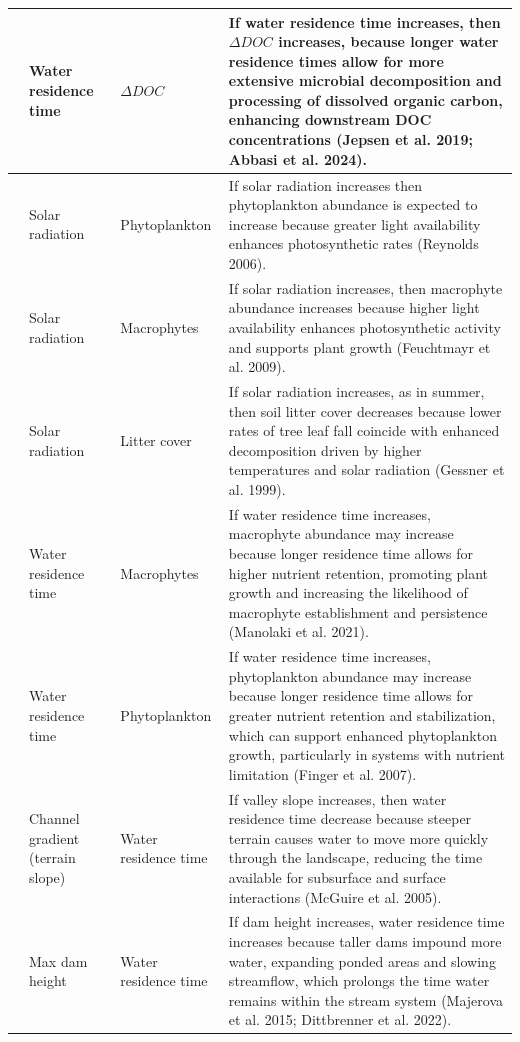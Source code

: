 \documentclass[11pt,a4paper]{article}
\begin{document}
\begin{longtable}{|>{\centering\arraybackslash}p{}|>{\raggedright\arraybackslash}p{}|>{\raggedright\arraybackslash}p{}|>{\raggedright\arraybackslash}p{}|}
5 & Water residence time & \(\Delta DOC\) & If water residence time increases, then \(\Delta DOC\) increases, because longer water residence times allow for more extensive microbial decomposition and processing of dissolved organic carbon, enhancing downstream DOC concentrations (Jepsen et al. 2019; Abbasi et al. 2024). \\ \hline
6 & Solar radiation & Phytoplankton & If solar radiation increases then phytoplankton abundance is expected to increase because greater light availability enhances photosynthetic rates (Reynolds 2006). \\ \hline
7 & Solar radiation & Macrophytes & If solar radiation increases, then macrophyte abundance increases because higher light availability enhances photosynthetic activity and supports plant growth (Feuchtmayr et al. 2009). \\ \hline
8 & Solar radiation & Litter cover & If solar radiation increases, as in summer, then soil litter cover decreases because lower rates of tree leaf fall coincide with enhanced decomposition driven by higher temperatures and solar radiation (Gessner et al. 1999). \\ \hline
9 & Water residence time & Macrophytes & If water residence time increases, macrophyte abundance may increase because longer residence time allows for higher nutrient retention, promoting plant growth and increasing the likelihood of macrophyte establishment and persistence (Manolaki et al. 2021). \\ \hline
10 & Water residence time & Phytoplankton & If water residence time increases, phytoplankton abundance may increase because longer residence time allows for greater nutrient retention and stabilization, which can support enhanced phytoplankton growth, particularly in systems with nutrient limitation (Finger et al. 2007). \\ \hline
11 & Channel gradient (terrain slope) & Water residence time & If valley slope increases, then water residence time decrease because steeper terrain causes water to move more quickly through the landscape, reducing the time available for subsurface and surface interactions (McGuire et al. 2005). \\ \hline
12 & Max dam height & Water residence time & If dam height increases, water residence time increases because taller dams impound more water, expanding ponded areas and slowing streamflow, which prolongs the time water remains within the stream system (Majerova et al. 2015; Dittbrenner et al. 2022). \\ \hline

\end{longtable}
\end{document}
